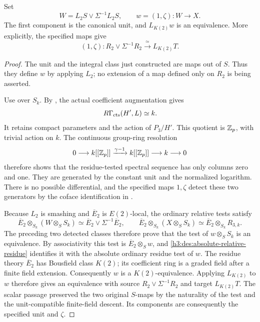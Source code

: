 \begin{theorem}\label{h3:thm:height-two-test}
Set
\[
 W=L_2S\vee\Sigma^{-1}L_2S,\qquad
 w=(1,\zeta):W\longrightarrow X.
\]
The first component is the canonical unit, and \(L_{K(2)}w\)
is an equivalence.  More explicitly, the specified maps give
\[
 (1,\zeta):R_2\vee\Sigma^{-1}R_2
       \xrightarrow{\ \simeq\ }L_{K(2)}T.
\]
\end{theorem}

\begin{proof}
The unit and the integral class just constructed are maps out
of \(S\).  Thus they define \(w\) by applying \(L_2\); no
extension of a map defined only on \(R_2\) is being asserted.

Use  over
\(S_k\).  By , the actual
coefficient augmentation gives
\[
 R\Gamma_{\mathrm{cts}}(H',L)\simeq k.
\]
It retains compact parameters and the action of \(P_3/H'\).
This quotient is \(\mathbb Z_p\), with trivial action on \(k\).
The continuous group-ring resolution
\[
 0\longrightarrow k[[\mathbb Z_p]]
   \xrightarrow{\gamma-1}k[[\mathbb Z_p]]
   \longrightarrow k\longrightarrow0
\]
therefore shows that the residue-tested spectral sequence has
only columns zero and one.  They are generated by the constant
unit and the normalized logarithm.  There is no possible
differential, and the specified maps \(1,\zeta\) detect these
two generators by the coface identification in
.

Because \(L_2\) is smashing and \(\overline E_2\) is
\(E(2)\)-local, the ordinary relative tests satisfy
\[
 \overline E_2\otimes_{S_k}(W\otimes_S S_k)
       \simeq \overline E_2\vee\Sigma^{-1}\overline E_2,
 \qquad
 \overline E_2\otimes_{S_k}(X\otimes_S S_k)
       \simeq \overline E_2\otimes_{S_k}R_{3,k}.
\]
The preceding two detected classes therefore prove that the test of
\(w\otimes_S S_k\) is an equivalence.  By associativity this test is
\(\overline E_2\otimes_S w\), and
\eqref{h3:des:absolute-relative-residue} identifies it with the
absolute ordinary residue test of \(w\).
The residue theory \(\overline E_2\) has Bousfield class \(K(2)\);
its coefficient ring is a graded field after a finite field
extension.  Consequently \(w\) is a \(K(2)\)-equivalence.
Applying \(L_{K(2)}\) to \(w\) therefore gives an equivalence with
source \(R_2\vee\Sigma^{-1}R_2\) and target \(L_{K(2)}T\).
The scalar passage preserved the two original \(S\)-maps by the
naturality of the test and the unit-compatible finite-field descent.
Its components are consequently the specified unit and \(\zeta\).
\end{proof}
